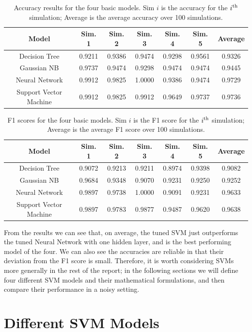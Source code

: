 \documentclass[11pt]{article}
\newcommand\Tstrut{\rule{0pt}{2.6ex}}
\newcommand\Bstrut{\rule[-0.9ex]{0pt}{0pt}}
\newcommand{\tline}{\Tstrut\Bstrut\\}
\begin{document}
\begin{table}[H]
	\centering
	\captionsetup{font=footnotesize}
	\begin{tabular}{| c || c | c | c | c | c || c |}
		\hline
		\textbf{Model} & \textbf{Sim.	1} & \textbf{Sim. 2} & \textbf{Sim. 3} & \textbf{Sim. 4} & \textbf{Sim. 5} & \textbf{Average} 
		\tline\hline
		Decision Tree & 0.9211 & 0.9386 & 0.9474 & 0.9298 & 0.9561  & 0.9326 
		\tline\hline
		Gaussian NB & 0.9737 & 0.9474 & 0.9298 & 0.9474 & 0.9474 & 0.9445
		\tline\hline
		Neural Network & 0.9912 & 0.9825 & 1.0000 & 0.9386 & 0.9474 & 0.9729
		\tline\hline
		Support Vector Machine & 0.9912 & 0.9825 & 0.9912 & 0.9649 & 0.9737 & 0.9736
		\tline\hline
	\end{tabular}
	\caption{Accuracy results for the four basic models. Sim $i$ is the accuracy for the $i^{\rm th}$ simulation; Average is the average accuracy over 100 simulations.}
\end{table}

\begin{table}[H]
	\centering
	\captionsetup{font=footnotesize}
	\begin{tabular}{| c || c | c | c | c | c || c |}
		\hline
		\textbf{Model} & \textbf{Sim.	1} & \textbf{Sim. 2} & \textbf{Sim. 3} & \textbf{Sim. 4} & \textbf{Sim. 5} & \textbf{Average} 
		\tline\hline
		Decision Tree & 0.9072 & 0.9213 & 0.9211 & 0.8974 & 0.9398 & 0.9082
		\tline\hline
		Gaussian NB & 0.9684 & 0.9348 & 0.9070 & 0.9231 & 0.9250 & 0.9252
		\tline\hline
		Neural Network & 0.9897 & 0.9738 & 1.0000 & 0.9091 & 0.9231 & 0.9633
		\tline\hline
		Support Vector Machine & 0.9897 & 0.9783 & 0.9877 & 0.9487 & 0.9620 & 0.9638
		\tline\hline
	\end{tabular}
	\caption{F1 scores for the four basic models. Sim $i$ is the F1 score for the $i^{\rm th}$ simulation; Average is the average F1 score over 100 simulations.}
\end{table}
From the results we can see that, on average, the tuned SVM just outperforms the tuned Neural Network with one hidden layer, and is the best performing model of the four. We can also see the accuracies are reliable in that their deviation from the F1 score is small. Therefore, it is worth considering SVMs more generally in the rest of the report; in the following sections we will define four different SVM models and their mathematical formulations, and then compare their performance in a noisy setting. 

\section{Different SVM Models}
\end{document}
